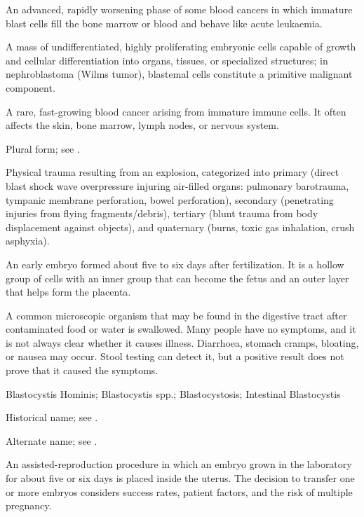  An advanced, rapidly worsening phase of some blood cancers in which immature blast cells fill the bone marrow or blood and behave like acute leukaemia.

 A mass of undifferentiated, highly proliferating embryonic cells capable of growth and cellular differentiation into organs, tissues, or specialized structures; in nephroblastoma (Wilms tumor), blastemal cells constitute a primitive malignant component.

 A rare, fast-growing blood cancer arising from immature immune cells. It often affects the skin, bone marrow, lymph nodes, or nervous system.

 Plural form; see .

 Physical trauma resulting from an explosion, categorized into primary (direct blast shock wave overpressure injuring air-filled organs: pulmonary barotrauma, tympanic membrane perforation, bowel perforation), secondary (penetrating injuries from flying fragments/debris), tertiary (blunt trauma from body displacement against objects), and quaternary (burns, toxic gas inhalation, crush asphyxia).

 An early embryo formed about five to six days after fertilization. It is a hollow group of cells with an inner group that can become the fetus and an outer layer that helps form the placenta.

 A common microscopic organism that may be found in the digestive tract after contaminated food or water is swallowed. Many people have no symptoms, and it is not always clear whether it causes illness. Diarrhoea, stomach cramps, bloating, or nausea may occur. Stool testing can detect it, but a positive result does not prove that it caused the symptoms.

\synonyms
Blastocystis Hominis; Blastocystis spp.; Blastocystosis; Intestinal Blastocystis

 Historical name; see .

 Alternate name; see .

 An assisted-reproduction procedure in which an embryo grown in the laboratory for about five or six days is placed inside the uterus. The decision to transfer one or more embryos considers success rates, patient factors, and the risk of multiple pregnancy.

